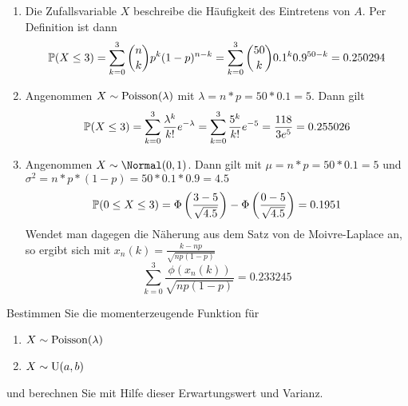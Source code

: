 \begin{exercisePage}[Normalverteilung]
	\begin{enumerate}[label=(zu \alph*), leftmargin=*]
		\item Die Zufallsvariable $X$ beschreibe die Häufigkeit des Eintretens von $A$. Per Definition ist dann
		\begin{equation*}
		\P(X \le 3) = \sum_{k=0}^3 \binom{n}{k} p^k (1-p)^{n-k} = \sum_{k=0}^3 \binom{50}{k} 0.1^k 0.9^{50-k} = 0.250294
		\end{equation*}
		\item Angenommen $X \sim \Poisson(\lambda)$ mit $\lambda = n * p = 50 * 0.1 = 5$. Dann gilt
		\begin{equation*}
			\P(X \le 3) = \sum_{k=0}^3 \frac{\lambda^k}{k!} e^{-\lambda} = \sum_{k=0}^3 \frac{5^k}{k!} e^{-5} = \frac{118}{3e^5} = 0.255026
		\end{equation*}
		\item Angenommen $X \sim \Normal(0,1)$. Dann gilt mit $\mu = n*p = 50 * 0.1 = 5$ und $\sigma^2 = n*p*(1-p) = 50 * 0.1 * 0.9 = 4.5$
		\begin{equation*}
			\P(0 \le X \le 3) = \Phi\left(\frac{3-5}{\sqrt{4.5}}\right) - \Phi\left(\frac{0 - 5}{\sqrt{4.5}} \right)= 0.1951
		\end{equation*}
		Wendet man dagegen die Näherung aus dem Satz von de Moivre-Laplace an, so ergibt sich mit $x_n(k) = \frac{k - np}{\sqrt{np(1-p)}}$ 
		\begin{equation*}
			\sum_{k=0}^3 \frac{\phi(x_n(k))}{\sqrt{np(1-p)}} = 0.233245
		\end{equation*}
	\end{enumerate}

	\begin{homework}
		Bestimmen Sie die momenterzeugende Funktion für
		\begin{enumerate}[leftmargin=*, nolistsep, topsep=-\parskip]
			\item $X \sim \Poisson(\lambda)$
			\item $X \sim \Uni(a,b)$
		\end{enumerate}
		und berechnen Sie mit Hilfe dieser Erwartungswert und Varianz.
	\end{homework}
	

\end{exercisePage}
